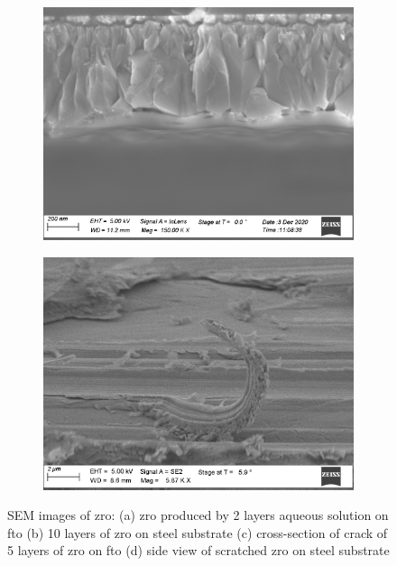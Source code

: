 \begin{figure}[bht]
    \begin{subfigure}{.45\textwidth}
        \centering
        \includegraphics[width=.99\textwidth]{Pics/sem/115_fto_cs_1x.png}
		\caption{}%
		\label{fig:sem-cs1}
    \end{subfigure}
    \begin{subfigure}{.45\textwidth}
        \centering
        \includegraphics[width=.99\textwidth]{Pics/sem/150_steel_cs_2Fx5.png}
		\caption{}%
		\label{fig:sem-cs2}
    \end{subfigure}
	\caption{
		SEM images of \gls{zro}:
		(a) \gls{zro} produced by 2 layers aqueous solution on \gls{fto}
		(b) 10 layers of \gls{zro} on steel substrate
		(c) cross-section of crack of 5 layers of \gls{zro} on \gls{fto}
		(d) side view of scratched \gls{zro} on steel substrate
		\label{fig:sem}
	}
\end{figure}
\enlargethispage{-\baselineskip}

